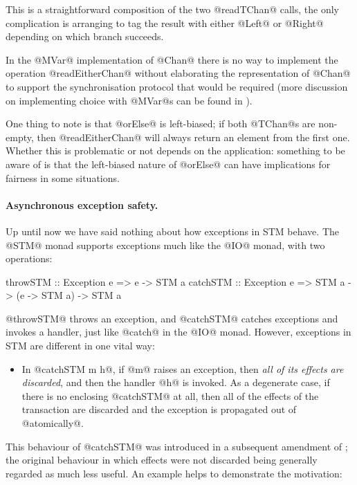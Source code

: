 \noindent This is a straightforward composition of the two @readTChan@ calls,
the only complication is arranging to tag the result with either
@Left@ or @Right@ depending on which branch succeeds.

In the @MVar@ implementation of @Chan@ there is no way to implement
the operation @readEitherChan@ without elaborating the representation of @Chan@ to
support the synchronisation protocol that would be required (more
discussion on implementing choice with @MVar@s can be found in
\citet{jones96concurrent}).

One thing to note is that @orElse@ is left-biased; if both @TChan@s
are non-empty, then @readEitherChan@ will always return an element
from the first one.  Whether this is problematic or not depends on the
application: something to be aware of is that the left-biased nature
of @orElse@ can have implications for fairness in some situations.

\paragraph{Asynchronous exception safety.} Up until now we have said
nothing about how exceptions in STM behave.  The @STM@ monad supports
exceptions much like the @IO@ monad, with two operations:

\begin{haskell}
throwSTM  :: Exception e => e -> STM a
catchSTM  :: Exception e => STM a -> (e -> STM a) -> STM a
\end{haskell}

\noindent @throwSTM@ throws an exception, and @catchSTM@ catches
exceptions and invokes a handler, just like @catch@ in the @IO@ monad.
However, exceptions in STM are different in one vital way:

\begin{itemize}
\item In @catchSTM m h@, if @m@ raises an exception, then \emph{all of
  its effects are discarded}, and then the handler @h@ is invoked.  As
  a degenerate case, if there is no enclosing @catchSTM@ at all, then
  all of the effects of the transaction are discarded and the
  exception is propagated out of @atomically@.
\end{itemize}

\noindent This behaviour of @catchSTM@ was introduced in a subsequent
amendment of \citet{stm}; the original behaviour in which effects were
not discarded being generally regarded as much less useful.  An
example helps to demonstrate the motivation:

